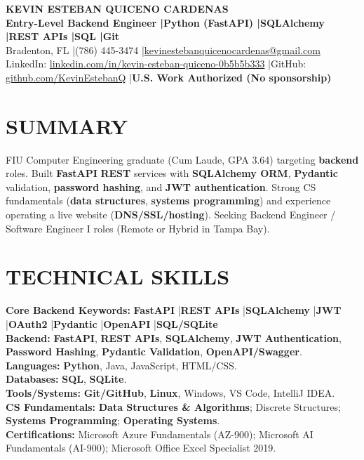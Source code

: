 \documentclass[10pt]{article}
\newcommand{\sep}{\;\;|\;\;}
\newcommand{\skill}[2]{\textbf{#1:} #2}
\begin{document}
{\Large \textbf{KEVIN ESTEBAN QUICENO CARDENAS}}\\
\textbf{Entry-Level Backend Engineer \sep \textbf{Python (FastAPI)} \sep \textbf{SQLAlchemy} \sep \textbf{REST APIs} \sep \textbf{SQL} \sep \textbf{Git}}\\
Bradenton, FL \sep (786) 445-3474 \sep \href{mailto:kevinestebanquicenocardenas@gmail.com}{kevinestebanquicenocardenas@gmail.com}\\
LinkedIn: \href{https://linkedin.com/in/kevin-esteban-quiceno-0b5b5b333}{linkedin.com/in/kevin-esteban-quiceno-0b5b5b333}
\sep GitHub: \href{https://github.com/KevinEstebanQ}{github.com/KevinEstebanQ}
\sep \textbf{U.S. Work Authorized (No sponsorship)}

\vspace{2pt}

\section{SUMMARY}
\small
FIU Computer Engineering graduate (Cum Laude, GPA 3.64) targeting \textbf{backend} roles. Built \textbf{FastAPI} \textbf{REST} services with \textbf{SQLAlchemy ORM}, \textbf{Pydantic} validation, \textbf{password hashing}, and \textbf{JWT authentication}. Strong CS fundamentals (\textbf{data structures}, \textbf{systems programming}) and experience operating a live website (\textbf{DNS/SSL/hosting}). Seeking Backend Engineer / Software Engineer I roles (Remote or Hybrid in Tampa Bay).
\normalsize

\section{TECHNICAL SKILLS}
\small
\skill{Core Backend Keywords}{\textbf{FastAPI} \sep \textbf{REST APIs} \sep \textbf{SQLAlchemy} \sep \textbf{JWT} \sep \textbf{OAuth2} \sep \textbf{Pydantic} \sep \textbf{OpenAPI} \sep \textbf{SQL/SQLite}}\\
\skill{Backend}{\textbf{FastAPI}, \textbf{REST APIs}, \textbf{SQLAlchemy}, \textbf{JWT Authentication}, \textbf{Password Hashing}, \textbf{Pydantic Validation}, \textbf{OpenAPI/Swagger}.}\\
\skill{Languages}{\textbf{Python}, Java, JavaScript, HTML/CSS.}\\
\skill{Databases}{\textbf{SQL}, \textbf{SQLite}.}\\
\skill{Tools/Systems}{\textbf{Git/GitHub}, \textbf{Linux}, Windows, VS Code, IntelliJ IDEA.}\\
\skill{CS Fundamentals}{\textbf{Data Structures \& Algorithms}; Discrete Structures; \textbf{Systems Programming}; \textbf{Operating Systems}.}\\
\skill{Certifications}{Microsoft Azure Fundamentals (AZ-900); Microsoft AI Fundamentals (AI-900); Microsoft Office Excel Specialist 2019.}
\normalsize
\end{document}
